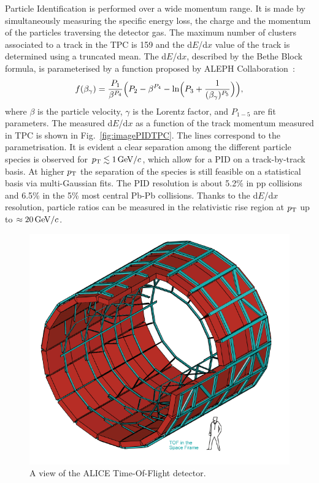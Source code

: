 Particle Identification is performed over a wide momentum range. It is made by 
simultaneously measuring the specific energy loss, the charge and the momentum of the 
particles traversing the detector gas. The maximum number of clusters associated to a track in the TPC 
is 159 and the d$E$/d$x$ value of the track is determined using a truncated mean.
The d$E$/d$x$, described by the Bethe Block formula,
is parameterised by a function proposed by ALEPH Collaboration~\cite{Rolandi:2008qla}:
\begin{equation}
f(\beta_\gamma) = \frac{P_1}{\beta^{P_4}} \Big ( P_2 - \beta^{P_4} - {\rm ln}\Big (   P_3 + \frac{1}{(\beta_\gamma)^{P_5}} \Big )   \Big ),
\end{equation}
where $\beta$ is the particle velocity, $\gamma$ is the Lorentz factor, and $P_{1-5}$ are fit parameters. 
The measured d$E$/d$x$ as a function of the track momentum measured in TPC is
shown in Fig.~\ref{fig:imagePIDTPC}. The lines correspond to the parametrisation. 
It is evident a clear separation among the different particle species
is observed for $p_{\rm T} \lesssim 1 \, \mathrm{GeV}/c$, which allow for a PID on a track-by-track basis. At higher $p_{\rm T}$ the separation of the species is still feasible 
on a statistical basis via multi-Gaussian fits. The PID resolution is about 5.2\% in 
pp collisions and 6.5\% in the 5\% most central Pb-Pb collisions. Thanks to the d$E$/d$x$ resolution, 
particle ratios can be measured in the relativistic rise region at $p_{\rm T}$ up to $\approx 20\, \mathrm{GeV}/c$.
 \begin{figure}[!h]
\centering
\includegraphics[width=.5\textwidth]{FigCap3/TOFCylinder.png}
\caption{A view of the ALICE Time-Of-Flight detector.}
\label{fig:imageTOF}
\end{figure}

